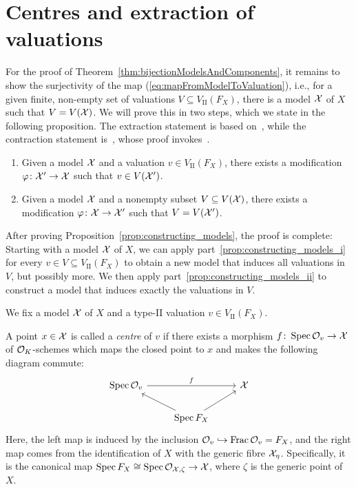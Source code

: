 \section{Centres and extraction of valuations}\label{sec:centres-and-extraction}
For the proof of Theorem~\ref{thm:bijectionModelsAndComponents}, it remains to show the surjectivity of the map (\eqref{eq:mapFromModelToValuation}),
i.e., for a given finite, non-empty set of valuations
$V \subseteq V_\textrm{II}(F_X)$, there is a model $\mathcal X$ of $X$ such that $V = V(\mathcal X)$.
We will prove this in two steps, which we state in the following proposition.
The extraction statement is based on~\cite[Proposition 3.14]{Rueth}, while the contraction statement is~\cite[Proposition 3.16]{Rueth}, whose proof invokes~\cite[Theorem 8.3.36]{Liu}.

\begin{proposition} \label{prop:constructing_models}
    \begin{enumerate}[label=\textup{(\roman*)}]
        \item Given a model $\mathcal X$ and a valuation $v \in V_\textrm{II}(F_X)$, there exists a modification
        $\varphi \colon \mathcal X' \to \mathcal X$ such that $v \in V(\mathcal X')$. \label{prop:constructing_models_i}
        \item Given a model $\mathcal X$ and a nonempty subset $V \subseteq V(\mathcal X)$,
        there exists a modification $\varphi \colon \mathcal X \to \mathcal X'$ such that $V = V(\mathcal X')$. \label{prop:constructing_models_ii}
    \end{enumerate}
\end{proposition}

After proving Proposition~\ref{prop:constructing_models}, the proof is complete:
Starting with a model $\mathcal X$ of $X$, we can apply part~\ref{prop:constructing_models_i} for every $v \in V \subseteq V_\textrm{II}(F_X)$
to obtain a new model that induces all valuations in $V$, but possibly more.
We then apply part~\ref{prop:constructing_models_ii} to construct a model that induces exactly the valuations in $V$.


We fix a model $\mathcal X$ of $X$ and a type-II valuation $v \in V_\textrm{II}(F_X)$.

\begin{definition}
    A point $x \in \mathcal X$ is called a \textit{centre} of $v$ if there exists a morphism $f \colon \operatorname{Spec} \mathcal{O}_v  \to \mathcal X$ of $\mathcal O_K $-schemes
    which maps the closed point to $x$ and makes the following diagram commute:
    \[
        \begin{tikzcd}
            \Spec \OO_v \arrow[rr, "f"] &                                 & \X \\
            & \Spec F_X \arrow[ru] \arrow[lu] &
        \end{tikzcd}
    \]
    Here, the left map is induced by the inclusion $\mathcal{O}_v \hookrightarrow \operatorname{Frac} \mathcal{O}_v = F_X$,
    and the right map comes from the identification of $X$ with the generic fibre $\mathcal X_\eta$.
    Specifically, it is the canonical map $\operatorname{Spec} F_X \cong \operatorname{Spec} \mathcal{O}_{\mathcal X, \zeta} \to \mathcal X$, where $\zeta$ is the generic point of $X$.
\end{definition}


